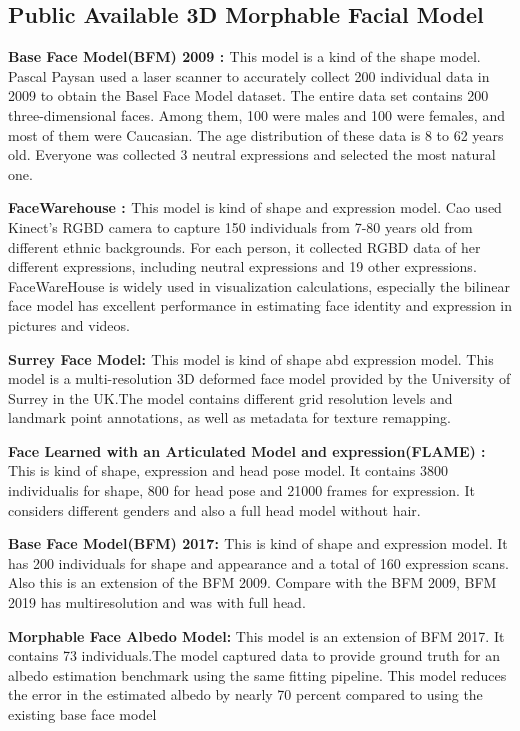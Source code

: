 \subsection{Public Available 3D Morphable Facial Model}

\textbf{Base Face Model(BFM) 2009 : \citep{paysan20093d}} This model is a kind of the shape model. Pascal Paysan used a laser scanner to accurately collect 200 individual data in 2009 to obtain the Basel Face Model dataset. The entire data set contains 200 three-dimensional faces. Among them, 100 were males and 100 were females, and most of them were Caucasian. The age distribution of these data is 8 to 62 years old. Everyone was collected 3 neutral expressions and selected the most natural one.

\textbf{FaceWarehouse : \citep{cao2013facewarehouse}} This model is kind of shape and expression model. Cao used Kinect's RGBD camera to capture 150 individuals from 7-80 years old from different ethnic backgrounds. For each person, it collected RGBD data of her different expressions, including neutral expressions and 19 other expressions.
FaceWareHouse is widely used in visualization calculations, especially the bilinear face model has excellent performance in estimating face identity and expression in pictures and videos.

\textbf{Surrey Face Model: \citep{huber2016multiresolution}} This model is kind of shape abd expression model. This model is a multi-resolution 3D deformed face model provided by the University of Surrey in the UK.The model contains different grid resolution levels and landmark point annotations, as well as metadata for texture remapping.

\textbf{Face Learned with an Articulated Model and expression(FLAME) : \citep{yu2017learning}} This is kind of shape, expression and head pose model. It contains 3800 individualis for shape, 800 for head pose and 21000 frames for expression. It considers different genders and also a full head model without hair.

\textbf{Base Face Model(BFM) 2017: \citep{gerig2018morphable}} This is kind of shape and expression model. It has 200 individuals for shape and appearance and a total of 160 expression scans. Also this is an extension of the BFM 2009. Compare with the BFM 2009, BFM 2019 has multiresolution and was with full head. 

\textbf{Morphable Face Albedo Model:\citep{smith2020morphable} }
This model is an extension of BFM 2017. It contains 73 individuals.The model captured data to provide ground truth for an albedo estimation benchmark using the same fitting pipeline. This model reduces the error in the estimated albedo by nearly 70 percent compared to using the existing base face model


